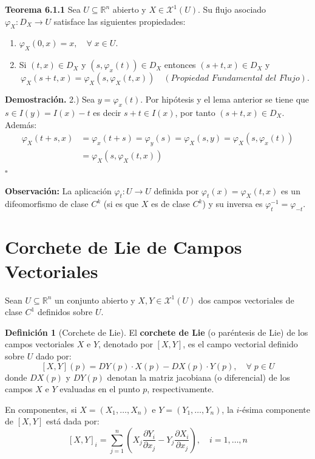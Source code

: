 \documentclass[11pt,a4paper]{article}
\theoremstyle{definition}
\newtheorem{definicion}{Definición}[section]
\theoremstyle{plain}
\theoremstyle{remark}
\begin{document}
	\noindent \textbf{Teorema 6.1.1} Sea $U \subseteq \mathbb{R}^n$ abierto y $X \in \mathcal{X}^1(U)$. Su flujo asociado $\varphi_X : D_X \to U$ satisface las siguientes propiedades:
	
	\begin{enumerate}
		\item $\varphi_X(0, x) = x, \quad \forall \; x \in U$.
		\item Si $(t, x) \in D_X$ y $(s, \varphi_x(t)) \in D_X$ entonces $(s + t, x) \in D_X$ y
		\[
		\varphi_X(s + t, x) = \varphi_X(s, \varphi_X(t, x)) \quad (\textit{Propiedad Fundamental del Flujo}).
		\]
	\end{enumerate}
	
	\noindent \textbf{Demostración.} 2.) Sea $y = \varphi_x(t)$. Por hipótesis y el lema anterior se tiene que $s \in I(y) = I(x) - t$ es decir $s + t \in I(x)$, por tanto $(s + t, x) \in D_X$. Además:
	\[
	\begin{aligned}
		\varphi_X(t + s, x) &= \varphi_x(t + s) = \varphi_y(s) = \varphi_X(s, y) = \varphi_X(s, \varphi_x(t)) \\
		&= \varphi_X(s, \varphi_X(t, x))
	\end{aligned}
	\]
	\hfill $\square$
	
	\textbf{Observación:} La aplicación $\varphi_t:U\to U$ definida por $\varphi_t(x) = \varphi_X(t,x)$ es un difeomorfismo de clase $C^k$ (si es que $X$ es de clase $C^k$) y su inversa es $\varphi_t^{-1} = \varphi_{-t}$.
	
	\section*{Corchete de Lie de Campos Vectoriales}
	
	Sean $U \subseteq \mathbb{R}^n$ un conjunto abierto y $X, Y \in \mathcal{X}^1(U)$ dos campos vectoriales de clase $C^1$ definidos sobre $U$.
	
	\begin{definicion}[Corchete de Lie]
		El \textbf{corchete de Lie} (o paréntesis de Lie) de los campos vectoriales $X$ e $Y$, denotado por $[X, Y]$, es el campo vectorial definido sobre $U$ dado por:
		\[
		[X, Y](p) = D Y(p) \cdot X(p) - D X(p) \cdot Y(p), \quad \forall \; p \in U
		\]
		donde $D X(p)$ y $D Y(p)$ denotan la matriz jacobiana (o diferencial) de los campos $X$ e $Y$ evaluadas en el punto $p$, respectivamente.
		
		En componentes, si $X = (X_1, \dots, X_n)$ e $Y = (Y_1, \dots, Y_n)$, la $i$-ésima componente de $[X, Y]$ está dada por:
		\[
		[X, Y]_i = \sum_{j=1}^n \left( X_j \frac{\partial Y_i}{\partial x_j} - Y_j \frac{\partial X_i}{\partial x_j} \right), \quad i = 1, \dots, n
		\]
	\end{definicion}
	
\end{document}

